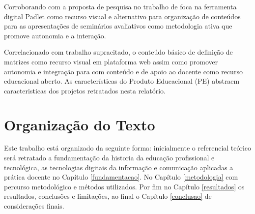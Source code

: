 Corroborando com a proposta de pesquisa no trabalho de  foca na ferramenta digital Padlet como recurso visual e alternativo para organização de conteúdos para as apresentações de seminários avaliativos como metodologia ativa que promove autonomia e a interação.

Correlacionado com trabalho supracitado, o conteúdo básico de definição de matrizes como recurso visual em plataforma web assim como promover autonomia e integração  para com conteúdo e de apoio ao docente como recurso educacional aberto. As características do Produto Educacional (PE) abstraem caracteristicas dos projetos retratados nesta relatório.









\section{Organização do Texto}
\label{organizacao_texto}

Este trabalho está organizado da seguinte forma: inicialmente o referencial teórico será retratado a fundamentação da historia da educação profissional e tecnológica, as tecnologias digitais da informação e comunicação aplicadas a prática docente no Capítulo \ref{fundamentacao}. No Capítulo \ref{metodologia} com percurso metodológico e métodos utilizados. Por fim no  Capítulo \ref{resultados} os resultados, conclusões e limitações, ao final o Capítulo \ref{conclusao} de considerações finais.


